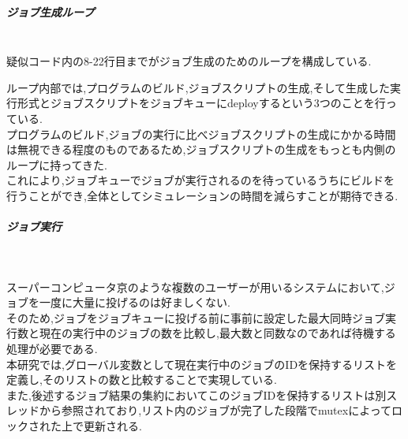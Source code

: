 \subparagraph{ジョブ生成ループ}~\\
疑似コード内の8-22行目までがジョブ生成のためのループを構成している.\\
{\footnotesize

}
ループ内部では,プログラムのビルド,ジョブスクリプトの生成,そして生成した実行形式とジョブスクリプトをジョブキューにdeployするという3つのことを行っている.\\
プログラムのビルド,ジョブの実行に比べジョブスクリプトの生成にかかる時間は無視できる程度のものであるため,ジョブスクリプトの生成をもっとも内側のループに持ってきた.\\
これにより,ジョブキューでジョブが実行されるのを待っているうちにビルドを行うことができ,全体としてシミュレーションの時間を減らすことが期待できる.\\
\subparagraph{ジョブ実行}~\\
{\footnotesize

}
スーパーコンピュータ京のような複数のユーザーが用いるシステムにおいて,ジョブを一度に大量に投げるのは好ましくない.\\
そのため,ジョブをジョブキューに投げる前に事前に設定した最大同時ジョブ実行数と現在の実行中のジョブの数を比較し,最大数と同数なのであれば待機する処理が必要である.\\
本研究では,グローバル変数として現在実行中のジョブのIDを保持するリストを定義し,そのリストの数と比較することで実現している.\\
また,後述するジョブ結果の集約においてこのジョブIDを保持するリストは別スレッドから参照されており,リスト内のジョブが完了した段階でmutexによってロックされた上で更新される.\\
